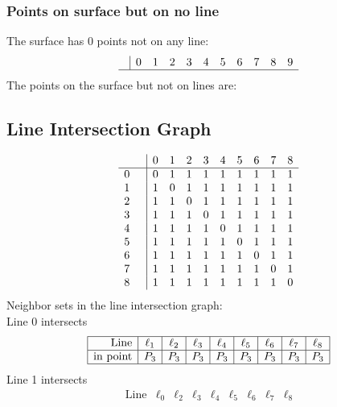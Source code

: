 \documentclass{article}
\begin{document}
{\subsubsection*{Points on surface but on no line}
The surface has 0 points not on any line:\\
$$
\begin{array}{r|*{10}{r}}
 & 0 & 1 & 2 & 3 & 4 & 5 & 6 & 7 & 8 & 9\\
\hline
\end{array}
$$
The points on the surface but not on lines are:\\
\begin{multicols}{2}
\noindent
\end{multicols}
\subsection*{Line Intersection Graph}
{\arraycolsep=1pt
$$
\begin{array}{rr|*{9}r}
 &  & 0 & 1 & 2 & 3 & 4 & 5 & 6 & 7 & 8\\
\hline
0 &  & 0 & 1 & 1 & 1 & 1 & 1 & 1 & 1 & 1\\
1 &  & 1 & 0 & 1 & 1 & 1 & 1 & 1 & 1 & 1\\
2 &  & 1 & 1 & 0 & 1 & 1 & 1 & 1 & 1 & 1\\
3 &  & 1 & 1 & 1 & 0 & 1 & 1 & 1 & 1 & 1\\
4 &  & 1 & 1 & 1 & 1 & 0 & 1 & 1 & 1 & 1\\
5 &  & 1 & 1 & 1 & 1 & 1 & 0 & 1 & 1 & 1\\
6 &  & 1 & 1 & 1 & 1 & 1 & 1 & 0 & 1 & 1\\
7 &  & 1 & 1 & 1 & 1 & 1 & 1 & 1 & 0 & 1\\
8 &  & 1 & 1 & 1 & 1 & 1 & 1 & 1 & 1 & 0\\
\end{array}
$$
}%
Neighbor sets in the line intersection graph:\\
Line 0 intersects 
$$
\begin{array}{|r*{8}{|c}|}
\hline
\mbox{Line}  & \ell_{1} & \ell_{2} & \ell_{3} & \ell_{4} & \ell_{5} & \ell_{6} & \ell_{7} & \ell_{8}\\
\hline
\mbox{in point}  & P_{3} & P_{3} & P_{3} & P_{3} & P_{3} & P_{3} & P_{3} & P_{3}\\
\hline
\end{array}
$$
Line 1 intersects 
$$
\begin{array}{|r*{8}{|c}|}
\hline
\mbox{Line}  & \ell_{0} & \ell_{2} & \ell_{3} & \ell_{4} & \ell_{5} & \ell_{6} & \ell_{7} & \ell_{8}\\

\end{array}$$}
\end{document}
